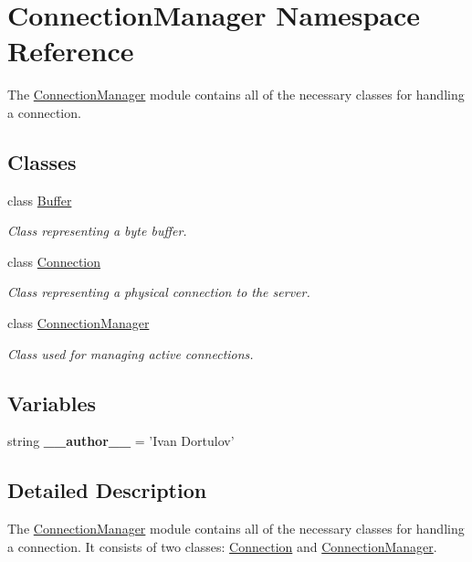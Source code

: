 \hypertarget{namespace_connection_manager}{\section{Connection\-Manager Namespace Reference}
\label{namespace_connection_manager}
}


The \hyperlink{namespace_connection_manager}{Connection\-Manager} module contains all of the necessary classes for handling a connection.  


\subsection*{Classes}
\begin{DoxyCompactItemize}
\item 
class \hyperlink{class_connection_manager_1_1_buffer}{Buffer}
\begin{DoxyCompactList}\small\item\em Class representing a byte buffer. \end{DoxyCompactList}\item 
class \hyperlink{class_connection_manager_1_1_connection}{Connection}
\begin{DoxyCompactList}\small\item\em Class representing a physical connection to the server. \end{DoxyCompactList}\item 
class \hyperlink{class_connection_manager_1_1_connection_manager}{Connection\-Manager}
\begin{DoxyCompactList}\small\item\em Class used for managing active connections. \end{DoxyCompactList}\end{DoxyCompactItemize}
\subsection*{Variables}
\begin{DoxyCompactItemize}
\item 
\hypertarget{namespace_connection_manager_acf0b032340426584ea50a6ce0ac79f84}{string {\bfseries \-\_\-\-\_\-author\-\_\-\-\_\-} = 'Ivan Dortulov'}\label{namespace_connection_manager_acf0b032340426584ea50a6ce0ac79f84}

\end{DoxyCompactItemize}


\subsection{Detailed Description}
The \hyperlink{namespace_connection_manager}{Connection\-Manager} module contains all of the necessary classes for handling a connection. It consists of two classes\-: \hyperlink{class_connection_manager_1_1_connection}{Connection} and \hyperlink{namespace_connection_manager}{Connection\-Manager}.

